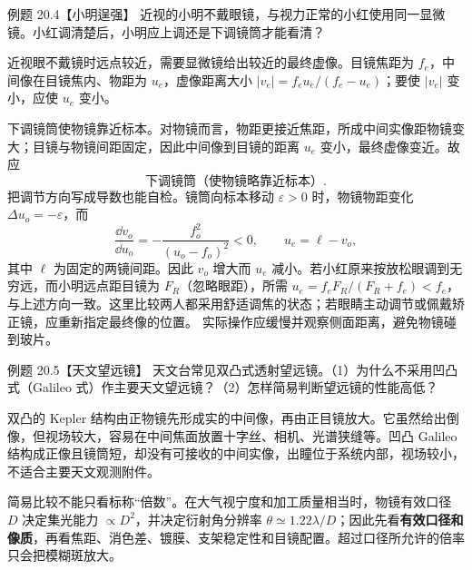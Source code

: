 \begin{origexamplebox}{例题 20.4【小明逞强】}
近视的小明不戴眼镜，与视力正常的小红使用同一显微镜。小红调清楚后，小明应上调还是下调镜筒才能看清？
\end{origexamplebox}
\begin{xesolution}
近视眼不戴镜时远点较近，需要显微镜给出较近的最终虚像。目镜焦距为 $f_e$，中间像在目镜焦内、物距为 $u_e$，虚像距离大小 $|v_e|=f_eu_e/(f_e-u_e)$；要使 $|v_e|$ 变小，应使 $u_e$ 变小。

下调镜筒使物镜靠近标本。对物镜而言，物距更接近焦距，所成中间实像距物镜变大；目镜与物镜间距固定，因此中间像到目镜的距离 $u_e$ 变小，最终虚像变近。故应
\[
 \boxed{\text{下调镜筒（使物镜略靠近标本）}}.
\]
把调节方向写成导数也能自检。镜筒向标本移动 $\varepsilon>0$ 时，物镜物距变化 $\Delta u_o=-\varepsilon$，而
\[
 \frac{\dd v_o}{\dd u_o}=-\frac{f_o^2}{(u_o-f_o)^2}<0,
 \qquad u_e=\ell-v_o,
\]
其中 $\ell$ 为固定的两镜间距。因此 $v_o$ 增大而 $u_e$ 减小。若小红原来按放松眼调到无穷远，而小明远点距目镜为 $F_R$（忽略眼距），所需 $u_e=f_eF_R/(F_R+f_e)<f_e$，与上述方向一致。这里比较两人都采用舒适调焦的状态；若眼睛主动调节或佩戴矫正镜，应重新指定最终像的位置。
实际操作应缓慢并观察侧面距离，避免物镜碰到玻片。
\end{xesolution}

\begin{origexamplebox}{例题 20.5【天文望远镜】}
天文台常见双凸式透射望远镜。（1）为什么不采用凹凸式（Galileo 式）作主要天文望远镜？（2）怎样简易判断望远镜的性能高低？
\end{origexamplebox}
\begin{xesolution}
双凸的 Kepler 结构由正物镜先形成实的中间像，再由正目镜放大。它虽然给出倒像，但视场较大，容易在中间焦面放置十字丝、相机、光谱狭缝等。凹凸 Galileo 结构成正像且镜筒短，却没有可接收的中间实像，出瞳位于系统内部，视场较小，不适合主要天文观测附件。

简易比较不能只看标称“倍数”。在大气视宁度和加工质量相当时，物镜有效口径 $D$ 决定集光能力 $\propto D^2$，并决定衍射角分辨率 $\theta\simeq1.22\lambda/D$；因此先看\textbf{有效口径和像质}，再看焦距、消色差、镀膜、支架稳定性和目镜配置。超过口径所允许的倍率只会把模糊斑放大。
\end{xesolution}

\SpecialAndCatEyePanel

